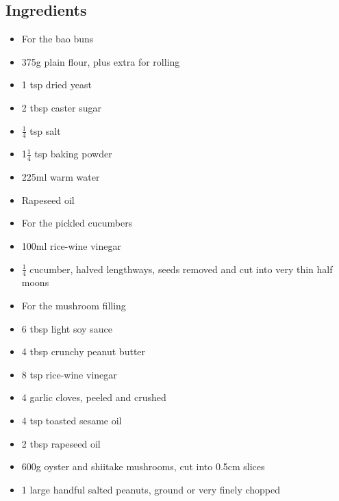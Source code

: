 \documentclass{book}
\begin{document}
\subsection*{Ingredients}
\begin{itemize}
\item For the bao buns 
\item 375g plain flour, plus extra for rolling
\item 1 tsp dried yeast
\item 2 tbsp caster sugar
\item $\frac{1}{4}$ tsp salt
\item 1$\frac{1}{4}$ tsp baking powder
\item 225ml warm water
\item Rapeseed oil
\end{itemize}

\begin{itemize}
\item For the pickled cucumbers
\item 100ml rice-wine vinegar
\item $\frac{1}{4}$ cucumber, halved lengthways, seeds removed and cut into very thin half moons
\end{itemize}

\begin{itemize}
\item For the mushroom filling
\item 6 tbsp light soy sauce 
\item 4 tbsp crunchy peanut butter
\item 8 tsp rice-wine vinegar
\item 4 garlic cloves, peeled and crushed
\item 4 tsp toasted sesame oil
\item 2 tbsp rapeseed oil
\item 600g oyster and shiitake mushrooms, cut into 0.5cm slices
\item 1 large handful salted peanuts, ground or very finely chopped
\end{itemize}
\end{document}

